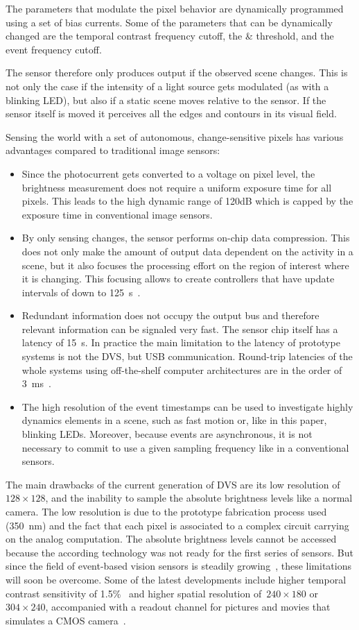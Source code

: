 The parameters that modulate the pixel behavior are dynamically programmed
using a set of bias currents. Some of the parameters that can be dynamically
changed are the temporal contrast frequency cutoff, the \pP \& \pN
threshold, and the event frequency cutoff. 

The sensor therefore only produces output if the observed scene changes.
This is not only the case if the intensity of a light source gets
modulated (as with a blinking LED), but also if a static scene moves
relative to the sensor. If the sensor itself is moved it perceives
all the edges and contours in its visual field.

Sensing the world with a set of autonomous, change-sensitive pixels
has various advantages compared to traditional image sensors:
\begin{itemize}
\item Since the photocurrent gets converted to a voltage on pixel level,
the brightness measurement does not require a uniform exposure time
for all pixels. This leads to the high dynamic range of 120dB which
is capped by the exposure time in conventional image sensors.
\item By only sensing changes, the sensor performs on-chip data compression.
This does not only make the amount of output data dependent on the
activity in a scene, but it also focuses the processing effort on
the region of interest where it is changing. This focusing allows
to create controllers that have update intervals of down to 125~\textmu{}s~\cite{conradt09pencil}.
\item Redundant information does not occupy the output bus and therefore
relevant information can be signaled very fast. The sensor chip itself
has a latency of 15~\textmu{}s. In practice the main limitation to
the latency of prototype systems is not the DVS, but USB communication.
Round-trip latencies of the whole systems using off-the-shelf computer
architectures are in the order of 3~ms~\cite{delbruck07fast}.
\item The high resolution of the event timestamps can be used to investigate
highly dynamics elements in a scene, such as fast motion or, like
in this paper, blinking LEDs. Moreover, because events are asynchronous,
it is not necessary to commit to use a given sampling frequency like
in a conventional sensors.
\end{itemize}
The main drawbacks of the current generation of DVS are its low resolution
of $128\times128$, and the inability to sample the absolute brightness
levels like a normal camera. The low resolution is due to the prototype
fabrication process used (350~nm) and the fact that each pixel is
associated to a complex circuit carrying on the analog computation.
The absolute brightness levels cannot be accessed because the according
technology was not ready for the first series of sensors. But since
the field of event-based vision sensors is steadily growing~\cite{delbruck10activity},
these limitations will soon be overcome. Some of the latest developments
include higher temporal contrast sensitivity of 1.5\%~\cite{serrano13128}
and higher spatial resolution of~$240\times180$ or~$304\times240$,
accompanied with a readout channel for pictures and movies that simulates
a CMOS camera~\cite{posch11qvga,berner13240}. 

